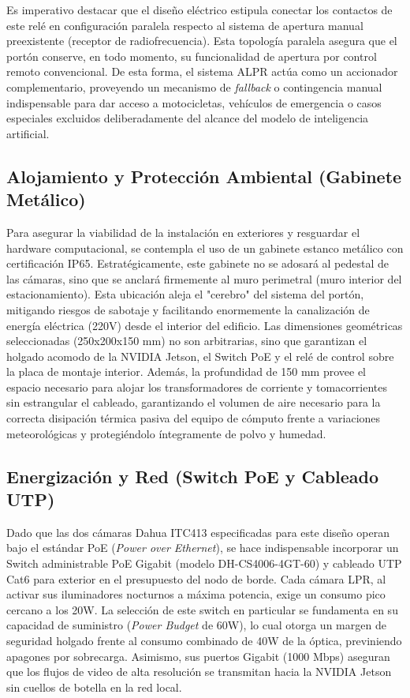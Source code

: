 Es imperativo destacar que el diseño eléctrico estipula conectar los contactos de este relé en configuración paralela respecto al sistema de apertura manual preexistente (receptor de radiofrecuencia). Esta topología paralela asegura que el portón conserve, en todo momento, su funcionalidad de apertura por control remoto convencional. De esta forma, el sistema ALPR actúa como un accionador complementario, proveyendo un mecanismo de \textit{fallback} o contingencia manual indispensable para dar acceso a motocicletas, vehículos de emergencia o casos especiales excluidos deliberadamente del alcance del modelo de inteligencia artificial.

\subsection{Alojamiento y Protección Ambiental (Gabinete Metálico)}

Para asegurar la viabilidad de la instalación en exteriores y resguardar el hardware computacional, se contempla el uso de un gabinete estanco metálico con certificación IP65. Estratégicamente, este gabinete no se adosará al pedestal de las cámaras, sino que se anclará firmemente al muro perimetral (muro interior del estacionamiento). Esta ubicación aleja el "cerebro" del sistema del portón, mitigando riesgos de sabotaje y facilitando enormemente la canalización de energía eléctrica (220V) desde el interior del edificio. Las dimensiones geométricas seleccionadas (250x200x150 mm) no son arbitrarias, sino que garantizan el holgado acomodo de la NVIDIA Jetson, el Switch PoE y el relé de control sobre la placa de montaje interior. Además, la profundidad de 150 mm provee el espacio necesario para alojar los transformadores de corriente y tomacorrientes sin estrangular el cableado, garantizando el volumen de aire necesario para la correcta disipación térmica pasiva del equipo de cómputo frente a variaciones meteorológicas y protegiéndolo íntegramente de polvo y humedad.

\subsection{Energización y Red (Switch PoE y Cableado UTP)}

Dado que las dos cámaras Dahua ITC413 especificadas para este diseño operan bajo el estándar PoE (\textit{Power over Ethernet}), se hace indispensable incorporar un Switch administrable PoE Gigabit (modelo DH-CS4006-4GT-60) y cableado UTP Cat6 para exterior en el presupuesto del nodo de borde. Cada cámara LPR, al activar sus iluminadores nocturnos a máxima potencia, exige un consumo pico cercano a los 20W. La selección de este switch en particular se fundamenta en su capacidad de suministro (\textit{Power Budget} de 60W), lo cual otorga un margen de seguridad holgado frente al consumo combinado de 40W de la óptica, previniendo apagones por sobrecarga. Asimismo, sus puertos Gigabit (1000 Mbps) aseguran que los flujos de video de alta resolución se transmitan hacia la NVIDIA Jetson sin cuellos de botella en la red local.

